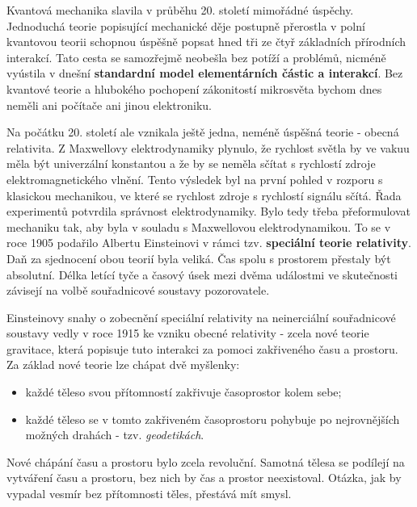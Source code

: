     Kvantová mechanika slavila v průběhu 20. století mimořádné úspěchy. Jednoduchá teorie popisující
    mechanické děje postupně přerostla v polní kvantovou teorii schopnou úspěšně popsat hned tři ze
    čtyř základních přírodních interakcí. Tato cesta se samozřejmě neobešla bez potíží a problémů,
    nicméně vyústila v dnešní \textbf{standardní model elementárních částic a interakcí}. Bez
    kvantové teorie a hlubokého pochopení zákonitostí mikrosvěta bychom dnes neměli ani počítače ani
    jinou elektroniku. 

    Na počátku 20. století ale vznikala ještě jedna, neméně úspěšná teorie - obecná relativita. Z
    Maxwellovy elektrodynamiky plynulo, že rychlost světla by ve vakuu měla být univerzální
    konstantou a že by se neměla sčítat s rychlostí zdroje elektromagnetického vlnění. Tento
    výsledek byl na první pohled v rozporu s klasickou mechanikou, ve které se rychlost zdroje s
    rychlostí signálu sčítá. Řada experimentů potvrdila správnost elektrodynamiky. Bylo tedy třeba
    přeformulovat mechaniku tak, aby byla v souladu s Maxwellovou elektrodynamikou. To se v roce
    1905 podařilo Albertu Einsteinovi v rámci tzv. \textbf{speciální teorie relativity}. Daň za
    sjednocení obou teorií byla veliká. Čas spolu s prostorem přestaly být absolutní. Délka letící
    tyče a časový úsek mezi dvěma událostmi ve skutečnosti závisejí na volbě souřadnicové soustavy
    pozorovatele.
    
    Einsteinovy snahy o zobecnění speciální relativity na neinerciální souřadnicové soustavy vedly v
    roce 1915 ke vzniku obecné relativity - zcela nové teorie gravitace, která popisuje tuto
    interakci za pomoci zakřiveného času a prostoru. Za základ nové teorie lze chápat dvě myšlenky:
    \begin{itemize}[noitemsep]
      \item každé těleso svou přítomností zakřivuje časoprostor kolem sebe;
      \item každé těleso se v tomto zakřiveném časoprostoru pohybuje po nejrovnějších možných
            drahách - tzv. \emph{geodetikách}.
    \end{itemize}

    Nové chápání času a prostoru bylo zcela revoluční. Samotná tělesa se podílejí na vytváření času
    a prostoru, bez nich by čas a prostor neexistoval. Otázka, jak by vypadal vesmír bez přítomnosti
    těles, přestává mít smysl.
    
